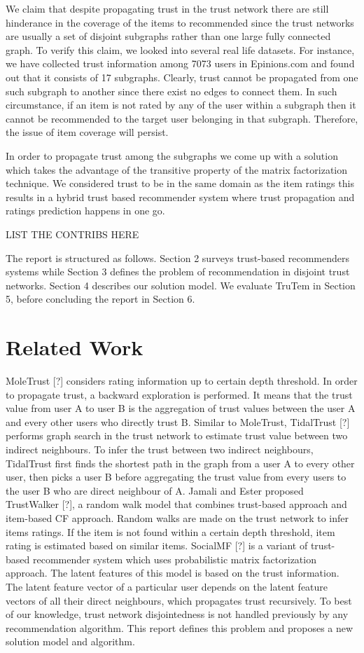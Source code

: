 \documentclass[11pt, conference, onecolumn]{IEEEtran}
\begin{document}
We claim that despite propagating trust in the trust network there are still hinderance in the coverage of the items to recommended since the trust networks are usually a set of disjoint subgraphs rather than one large fully connected graph. To verify this claim, we looked into several real life datasets. For instance, we have collected trust information among 7073 users in Epinions.com and found out that it consists of 17 subgraphs. Clearly, trust cannot be propagated from one such subgraph to another since there exist no edges to connect them. In such circumstance, if an item is not rated by any of the user within a subgraph then it cannot be recommended to the target user belonging in that subgraph. Therefore, the issue of item coverage will persist.

In order to propagate trust among the subgraphs we come up with a solution which takes the advantage of the transitive property of the matrix factorization technique. We considered trust to be in the same domain as the item ratings this results in a hybrid trust based recommender system where trust propagation and ratings prediction happens in one go.

LIST THE CONTRIBS HERE

The report is structured as follows. Section 2 surveys trust-based recommenders systems while Section 3 defines the problem of recommendation in disjoint trust networks. Section 4 describes our solution model. We evaluate TruTem in Section 5, before concluding the report in Section 6.


\section{Related Work} \label{sec:related}
MoleTrust [?] considers rating information up to certain depth threshold. In order to propagate trust, a backward exploration is performed. It means that the trust value from user A to user B is the aggregation of trust values between the user A and every other users who directly trust B. Similar to MoleTrust, TidalTrust [?] performs graph search in the trust network to estimate trust value between two indirect neighbours. To infer the trust between two indirect neighbours, TidalTrust first finds the shortest path in the graph from a user A to every other user, then picks a user B before aggregating the trust value from every users to the user B who are direct neighbour of A. Jamali and Ester proposed TrustWalker [?], a random walk model that combines trust-based approach and item-based CF approach. Random walks are made on the trust network to infer items ratings. If the item is not found within a certain depth threshold, item rating is estimated based on similar items. SocialMF [?] is a variant of trust-based recommender system which uses probabilistic matrix factorization approach. The latent features of this model is based on the trust information. The latent feature vector of a particular user depends on the latent feature vectors of all their direct neighbours, which propagates trust recursively.
To best of our knowledge, trust network disjointedness is not handled previously by any recommendation algorithm. This report defines this problem and proposes a new solution model and algorithm.
\end{document}
